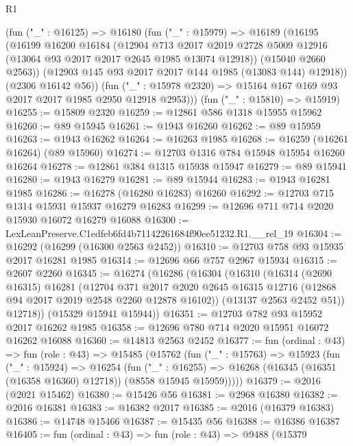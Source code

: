 \begin{lexlean}{R1}
\begin{coremodule}
      (fun ("_" : @16125) =>
      @16180
        (fun ("_" : @15979) =>
        @16189
          (@16195
            (@16199
              @16200
              @16184
              (@12904
                @713
                @2017
                @2019
                @2728
                @5009
                @12916
                (@13064 @93 @2017 @2017 @2645 @1985 @13074 @12918))
              (@15040 @2660 @2563))
            (@12903 @145 @93 @2017 @2017 @144 @1985 (@13083 @144) @12918))
          (@2306 @16142 @56))
        (fun ("_" : @15978 @2320) => @15164 @167 @169 @93 @2017 @2017 @1985 @2950 @12918 @2953)))
    (fun ("_" : @15810) => @15919)
@16255 := @15809 @2320
@16259 := @12861 @586 @1318 @15955 @15962
@16260 := @89 @15945
@16261 := @1943 @16260
@16262 := @89 @15959
@16263 := @1943 @16262
@16264 := @16263 @1985
@16268 := @16259 (@16261 @16264) (@89 @15960)
@16274 := @12703 @1316 @784 @15948 @15954 @16260 @16264
@16278 := @12861 @384 @1315 @15938 @15947
@16279 := @89 @15941
@16280 := @1943 @16279
@16281 := @89 @15944
@16283 := @1943 @16281 @1985
@16286 := @16278 (@16280 @16283) @16260
@16292 := @12703 @715 @1314 @15931 @15937 @16279 @16283
@16299 := @12696 @711 @714 @2020 @15930 @16072 @16279 @16088
@16300 := LexLeanPreserve.C1edfeb6fd4b71142261684f90ee51232.R1.__rel_19
@16304 := @16292 (@16299 (@16300 @2563 @2452))
@16310 := @12703 @758 @93 @15935 @2017 @16281 @1985
@16314 := @12696 @66 @757 @2967 @15934
@16315 := @2607 @2260
@16345 := @16274
    (@16286
      (@16304
        (@16310
          (@16314
            (@2690 @16315)
            @16281
            (@12704
              @371
              @2017
              @2020
              @2645
              @16315
              @12716
              (@12868 @94 @2017 @2019 @2548 @2260 @12878 @16102))
            (@13137 @2563 @2452 @51))
          @12718))
      (@15329 @15941 @15944))
@16351 := @12703 @782 @93 @15952 @2017 @16262 @1985
@16358 := @12696 @780 @714 @2020 @15951 @16072 @16262 @16088
@16360 := @14813 @2563 @2452
@16377 := fun (ordinal : @43) =>
  fun (role : @43) =>
  @15485
    (@15762
      (fun ("_" : @15763) =>
      @15923
        (fun ("_" : @15924) =>
        @16254
          (fun ("_" : @16255) =>
          @16268 (@16345 (@16351 (@16358 @16360) @12718)) (@8558 @15945 @15959)))))
@16379 := @2016 (@2021 @15462)
@16380 := @15426 @56
@16381 := @2968 @16380
@16382 := @2016 @16381
@16383 := @16382 @2017
@16385 := @2016 (@16379 @16383)
@16386 := @14748 @15466
@16387 := @15435 @56
@16388 := @16386 @16387
@16405 := fun (ordinal : @43) =>
  fun (role : @43) =>
  @9488
    (@15379

\end{coremodule}
\end{lexlean}
